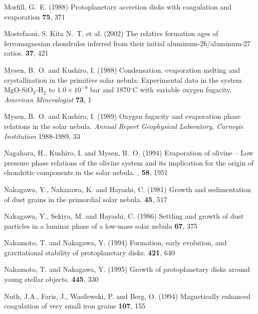 \begin{literature}
\item
Morfill, G.~E. (1988) Protoplanetary accretion disks with coagulation and
evaporation \ica \textbf{75}, 371

\item
Mostefaoui, S. Kita N.~T. et al.  (2002) The relative formation ages of
ferromagnesian chondrules inferred from their initial aluminum-26/aluminum-27
ratios. \mps \textbf{37}, 421  

\item
Mysen, B.~O. and Kushiro, I. (1988) Condensation, evaporation melting and
crystallization in the primitive solar nebula: Experimental data in the system
MgO-SiO$_2$-H$_2$ to $1.0\times10^{-9}$ bar and 1870$^\circ$C with variable
oxygen fugacity. \textit{American Mineralogist} \textbf{73}, 1

\item
Mysen, B.~O. and Kushiro, I. (1989) Oxygen fugacity and evaporation phase
relations in the solar nebula. \textit{Annual Report Geophysical Laboratory,
Carnegie Institution} 1988-1989, 33                                  

\item
Nagahara, H., Kushiro, I. and Mysen, B.~O. (1994) Evaporation of olivine -- Low
pressure phase relations of the olivine system and its implication for the
origin of chondritic components in the solar nebula. \gca,  \textbf{58}, 1951 

\item
Nakagawa, Y., Nakazawa, K. and Hayashi, C. (1981) Growth and sedimentation of
dust grains in the primordial solar nebula. \ica \textbf{45}, 517

\item
Nakagawa, Y., Sekiya, M. and Hayashi, C. (1986) Settling and growth of dust
particles in a laminar phase of a low-mass solar nebula \ica \textbf{67}, 375

\item
Nakamoto, T. and Nakagawa, Y. (1994) Formation, early evolution, and
gravitational stability of protoplanetary disks. \apj \textbf{421}, 640

\item
Nakamoto, T. and Nakagawa, Y. (1995) Growth of protoplanetary disks around
young stellar objects. \apj \textbf{445}, 330

\item
Nuth, J.A., Faris, J., Wasilewski, P. and Berg, O. (1994)  Magnetically
enhanced coagulation of very small iron grains \ica \textbf{107}, 155


\end{literature}
